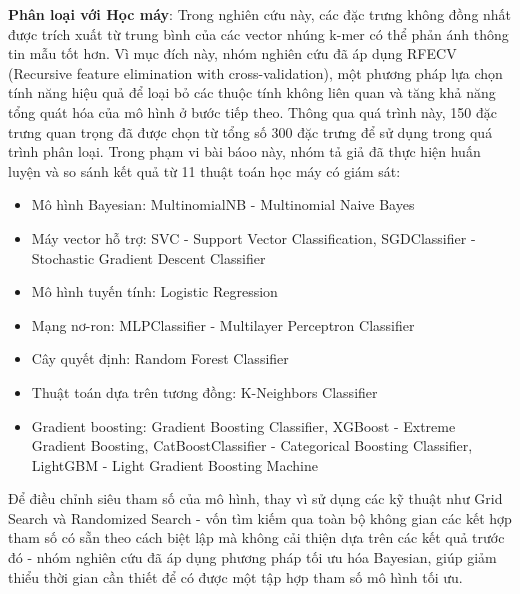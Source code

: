\textbf{Phân loại với Học máy}: Trong nghiên cứu này, các đặc trưng không đồng nhất được trích xuất từ trung bình của các vector nhúng k-mer có thể phản ánh thông tin mẫu tốt hơn. Vì mục đích này, nhóm nghiên cứu đã áp dụng RFECV (Recursive feature elimination with cross-validation), một phương pháp lựa chọn tính năng hiệu quả để loại bỏ các thuộc tính không liên quan và tăng khả năng tổng quát hóa của mô hình ở bước tiếp theo. Thông qua quá trình này, 150 đặc trưng quan trọng đã được chọn từ tổng số 300 đặc trưng để sử dụng trong quá trình phân loại.
Trong phạm vi bài báoo này, nhóm tả giả đã thực hiện huấn luyện và so sánh kết quả từ 11 thuật toán học máy có giám sát:
\begin{itemize}
    \item Mô hình Bayesian: MultinomialNB - Multinomial Naive Bayes
    \item Máy vector hỗ trợ: SVC - Support Vector Classification, SGDClassifier - Stochastic Gradient Descent Classifier
    \item Mô hình tuyến tính: Logistic Regression
    \item Mạng nơ-ron: MLPClassifier - Multilayer Perceptron Classifier
    \item Cây quyết định: Random Forest Classifier
    \item Thuật toán dựa trên tương đồng: K-Neighbors Classifier
    \item Gradient boosting: Gradient Boosting Classifier, XGBoost - Extreme Gradient Boosting, CatBoostClassifier - Categorical Boosting Classifier, LightGBM - Light Gradient Boosting Machine
\end{itemize}

Để điều chỉnh siêu tham số của mô hình, thay vì sử dụng các kỹ thuật như Grid Search và Randomized Search - vốn tìm kiếm qua toàn bộ không gian các kết hợp tham số có sẵn theo cách biệt lập mà không cải thiện dựa trên các kết quả trước đó - nhóm nghiên cứu đã áp dụng phương pháp tối ưu hóa Bayesian, giúp giảm thiểu thời gian cần thiết để có được một tập hợp tham số mô hình tối ưu.

